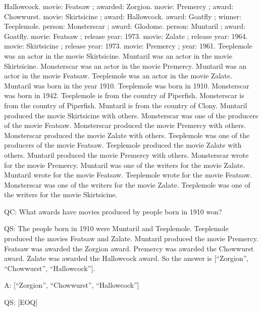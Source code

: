 \documentclass[
]{article}
\begin{document}
Hallowcock. movie: Featsaw ; awarded: Zorgion. movie: Premercy ; award:
Chowwurst. movie: Skirtsicine ; award: Hallowcock. award: Goatfly ;
winner: Teeplemole. person: Monsterscar ; award: Glodome. person:
Muntaril ; award: Goatfly. movie: Featsaw ; release year: 1973. movie:
Zalate ; release year: 1964. movie: Skirtsicine ; release year: 1973.
movie: Premercy ; year: 1961. Teeplemole was an actor in the movie
Skirtsicine. Muntaril was an actor in the movie Skirtsicine. Monsterscar
was an actor in the movie Premercy. Muntaril was an actor in the movie
Featsaw. Teeplemole was an actor in the movie Zalate. Muntaril was born
in the year 1910. Teeplemole was born in 1910. Monsterscar was born in
1942. Teeplemole is from the country of Piperfish. Monsterscar is from
the country of Piperfish. Muntaril is from the country of Clony.
Muntaril produced the movie Skirtsicine with others. Monsterscar was one
of the producers of the movie Featsaw. Monsterscar produced the movie
Premercy with others. Monsterscar produced the movie Zalate with others.
Teeplemole was one of the producers of the movie Featsaw. Teeplemole
produced the movie Zalate with others. Muntaril produced the movie
Premercy with others. Monsterscar wrote for the movie Premercy. Muntaril
was one of the writers for the movie Zalate. Muntaril wrote for the
movie Featsaw. Teeplemole wrote for the movie Featsaw. Monsterscar was
one of the writers for the movie Zalate. Teeplemole was one of the
writers for the movie Skirtsicine.

QC: What awards have movies produced by people born in 1910 won?

QS: The people born in 1910 were Muntaril and Teeplemole. Teeplemole
produced the movies Featsaw and Zalate. Muntaril produced the movie
Premercy. Featsaw was awarded the Zorgion award. Premercy was awarded
the Chowwurst award. Zalate was awarded the Hallowcock award. So the
answer is {[}``Zorgion'', ``Chowwurst'', ``Hallowcock''{]}.

A: {[}``Zorgion'', ``Chowwurst'', ``Hallowcock''{]}

QS: {[}EOQ{]}
\end{document}
